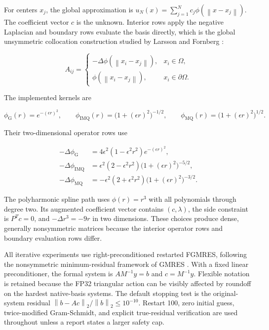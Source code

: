 \documentclass[11pt]{article}
\newcommand{\norm}[1]{\left\lVert #1\right\rVert}
\newcommand{\trans}{^{T}}
\begin{document}
For centers $x_j$, the global approximation is $u_N(x)=\sum_{j=1}^{N}c_j\phi(\norm{x-x_j})$. The coefficient vector $c$ is the unknown. Interior rows apply the negative Laplacian and boundary rows evaluate the basis directly, which is the global unsymmetric collocation construction studied by Larsson and Fornberg \cite{larsson2003}:

\begin{equation}
A_{ij}=
\begin{cases}
-\Delta\phi(\norm{x_i-x_j}), & x_i\in\Omega,\\
\phi(\norm{x_i-x_j}), & x_i\in\partial\Omega.
\end{cases}
\label{eq:collocation}
\end{equation}

The implemented kernels are

\begin{equation}
\phi_{\mathrm{G}}(r)=e^{-(\epsilon r)^2},
\qquad
\phi_{\mathrm{IMQ}}(r)=\bigl(1+(\epsilon r)^2\bigr)^{-1/2},
\qquad
\phi_{\mathrm{MQ}}(r)=\bigl(1+(\epsilon r)^2\bigr)^{1/2}.
\end{equation}

Their two-dimensional operator rows use

\begin{align}
-\Delta\phi_{\mathrm{G}}
&=4\epsilon^2(1-\epsilon^2r^2)e^{-(\epsilon r)^2}, \\
-\Delta\phi_{\mathrm{IMQ}}
&=\epsilon^2(2-\epsilon^2r^2)\bigl(1+(\epsilon r)^2\bigr)^{-5/2}, \\
-\Delta\phi_{\mathrm{MQ}}
&=-\epsilon^2(2+\epsilon^2r^2)\bigl(1+(\epsilon r)^2\bigr)^{-3/2}.
\end{align}

The polyharmonic spline path uses $\phi(r)=r^3$ with all polynomials through degree two. Its augmented coefficient vector contains $(c,\lambda)$, the side constraint is $P\trans c=0$, and $-\Delta r^3=-9r$ in two dimensions. These choices produce dense, generally nonsymmetric matrices because the interior operator rows and boundary evaluation rows differ.

All iterative experiments use right-preconditioned restarted FGMRES, following the nonsymmetric minimum-residual framework of GMRES \cite{saad1986}. With a fixed linear preconditioner, the formal system is $AM^{-1}y=b$ and $c=M^{-1}y$. Flexible notation is retained because the FP32 triangular action can be visibly affected by roundoff on the hardest native-basis systems. The default stopping test is the original-system residual $\norm{b-Ac}_2/\norm{b}_2\le10^{-10}$. Restart 100, zero initial guess, twice-modified Gram-Schmidt, and explicit true-residual verification are used throughout unless a report states a larger safety cap.
\end{document}
